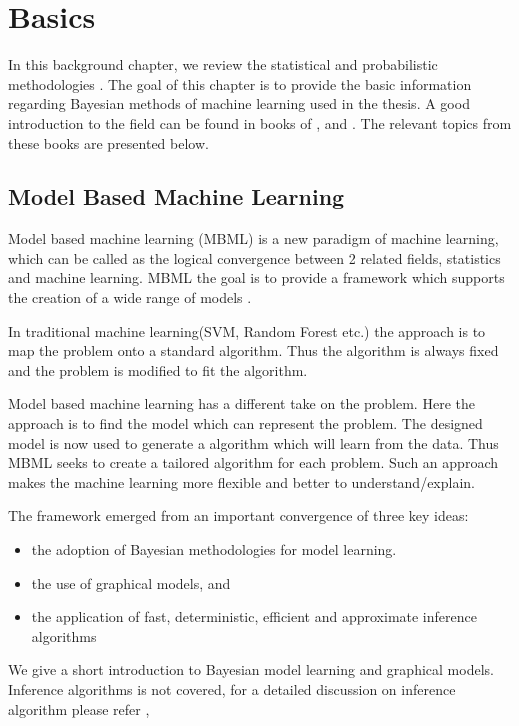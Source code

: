

\chapter{Basics}
\label{chapter:basics}
In this background chapter, we review the statistical and probabilistic methodologies .
The goal of this chapter is to provide the basic information regarding Bayesian methods of machine learning used in the thesis. A good introduction to the field can be found in books of \cite{bishop2007pattern}, \cite{kruschke2014doing} and \cite{lee2014bayesian}. The relevant topics from these books are presented below.

\section{Model Based Machine Learning}

Model based machine learning (MBML) is a new paradigm of machine learning, which can be called as the logical convergence between 2 related fields, statistics and machine learning. MBML the goal is to provide a framework which supports the creation of a wide range of models \cite{Bishop20120222}.

In traditional machine learning(SVM, Random Forest etc.) the approach is to map the problem onto a standard algorithm. Thus the algorithm is always fixed and the problem is modified to fit the algorithm.

Model based machine learning has a different take on the problem. Here the approach is to find the model which can represent the problem. The designed model is now used to generate a algorithm which will learn from the data. Thus MBML seeks to create a tailored algorithm for each problem. Such an approach makes the machine learning more flexible and better to understand/explain.

The framework emerged from an important convergence of three key ideas:
   \begin{itemize}
	\item the adoption of Bayesian methodologies for model learning.
	\item the use of graphical models, and
	\item the application of fast, deterministic, efficient and approximate inference algorithms
\end{itemize}

We give a short introduction to Bayesian model learning and graphical models. Inference algorithms is not covered, for a detailed discussion on inference algorithm please refer \cite{beal2003variational}, \cite{minka2001family}

